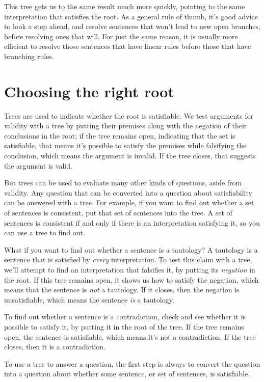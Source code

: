 This tree gets us to the same result much more quickly, pointing to the same interpretation that satisfies the root. As a general rule of thumb, it's good advice to look a step ahead, and resolve sentences that won't lead to new open branches, before resolving ones that will. For just the same reason, it is usually more efficient to resolve those sentences that have linear rules before those that have branching rules.

\section{Choosing the right root}
\label{sec.sl.treeroots}

Trees are used to indicate whether the root is satisfiable. We test arguments for validity with a tree by putting their premises along with the negation of their conclusions in the root; if the tree remains open, indicating that the set is satisfiable, that means it's possible to satisfy the premises while falsifying the conclusion, which means the argument is invalid. If the tree closes, that suggests the argument is valid.

But trees can be used to evaluate many other kinds of questions, aside from validity. Any question that can be converted into a question about satisfiability can be answered with a tree. For example, if you want to find out whether a set of sentences is consistent, put that set of sentences into the tree. A set of sentences is consistent if and only if there is an interpretation satisfying it, so you can use a tree to find out.

What if you want to find out whether a sentence is a tautology? A tautology is a sentence that is satisfied by \emph{every} interpretation. To test this claim with a tree, we'll attempt to find an interpretation that falsifies it, by putting its \emph{negation} in the root. If this tree remains open, it shows us how to satisfy the negation, which means that the sentence is \emph{not} a tautology. If it closes, then the negation is unsatisfiable, which means the sentence \emph{is} a tautology.

To find out whether a sentence is a contradiction, check and see whether it is possible to satisfy it, by putting it in the root of the tree. If the tree remains open, the sentence is satisfiable, which means it's not a contradiction. If the tree closes, then it is a contradiction.

To use a tree to answer a question, the first step is always to convert the question into a question about whether some sentence, or set of sentences, is satisfiable. 


